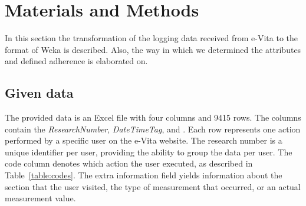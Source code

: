 \section{Materials and Methods} \label{section:materialsAndMethods}
In this section the transformation of the logging data received from e-Vita to the  format of Weka is described. Also, the way in which we determined the attributes and defined adherence is elaborated on.
\subsection{Given data} \label{subsection:givenData}
The provided data is an Excel file with four columns and 9415 rows. The columns contain the \emph{ResearchNumber}, \emph{DateTimeTag},  and . Each row represents one action performed by a specific user on the e-Vita website. The research number is a unique identifier per user, providing the ability to group the data per user. The code column denotes which action the user executed, as described in Table~\ref{table:codes}. The extra information field yields information about the section that the user visited, the type of measurement that occurred, or an actual measurement value.

